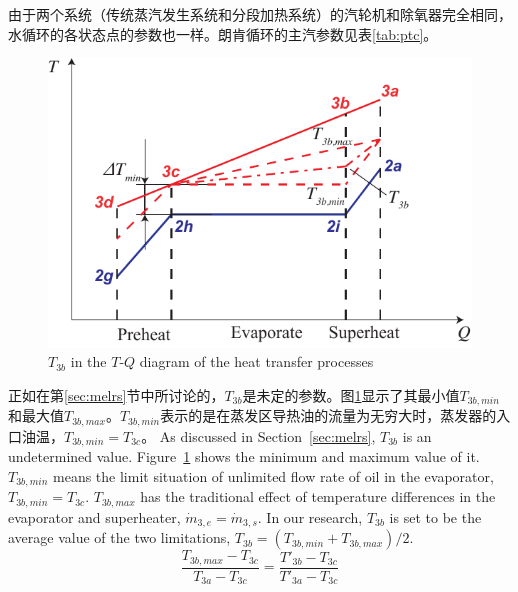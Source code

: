 由于两个系统（传统蒸汽发生系统和分段加热系统）的汽轮机和除氧器完全相同，水循环的各状态点的参数也一样。朗肯循环的主汽参数见表\ref{tab:ptc}。

\noindent \begin{figure}[htbp]
\begin{center}
	\includegraphics[width = 0.7\columnwidth]{fig/T3b}
	\caption{$T_{3b}$ in the $T$-$Q$ diagram of the heat transfer processes}
	\label{fig:T3b}
\end{center}
\end{figure}

正如在第\ref{sec:melrs}节中所讨论的，$T_{3b}$是未定的参数。图\ref{fig:T3b}显示了其最小值$T_{3b,min}$和最大值$T_{3b,max}$。$T_{3b,min}$表示的是在蒸发区导热油的流量为无穷大时，蒸发器的入口油温，$T_{3b,min} = T_{3c}$。
As discussed in Section~\ref{sec:melrs}, $T_{3b}$ is an undetermined value. Figure~\ref{fig:T3b} shows the minimum and maximum value of it. $T_{3b,min}$ means the limit situation of unlimited flow rate of oil in the evaporator, $T_{3b,min} = T_{3c}$. $T_{3b,max}$ has the traditional effect of temperature differences in the evaporator and superheater, $\dot{m}_{3,e} = \dot{m}_{3,s}$. In our research, $T_{3b}$ is set to be the average value of the two limitations, $T_{3b} = (T_{3b,min} + T_{3b,max}) / 2$.
\begin{equation}
  \dfrac{T_{3b,max}-T_{3c}}{T_{3a} - T_{3c}} = \dfrac{T'_{3b} - T_{3c}}{T'_{3a} - T_{3c}}
\end{equation}

